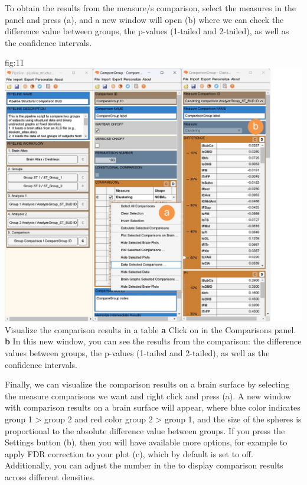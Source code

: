 \documentclass[justified]{tufte-handout}
\begin{document}
To obtain the results from the measure/s comparison, select the measures in the  panel and press ({a}), and a new window will open ({b}) where we can check the difference value between groups, the p-values (1-tailed and 2-tailed), as well as the confidence intervals.

	{fig:11}
	{
	\includegraphics{fig11.jpg}
	}
	{Visualize the comparison results in a table}
	{
	{\bf a} Click on  in the Comparisons panel.
	{\bf b} In this new window, you can see the results from the comparison: the difference values between groups, the p-values (1-tailed and 2-tailed), as well as the confidence intervals.
	}
 
 \clearpage
 
Finally, we can visualize the comparison results on a brain surface by selecting the measure comparisons we want and right click and press  ({a}). A new window with comparison results on a brain surface will appear, where blue color indicates group 1 > group 2 and red color group 2 > group 1, and the size of the spheres is proportional to the absolute difference value between groups. If you press the Settings button ({b}), then you will have available more options, for example to apply FDR correction to your plot ({c}), which by default is set to off. Additionally, you can adjust the number in the  to display comparison results across different densities.
\end{document}
